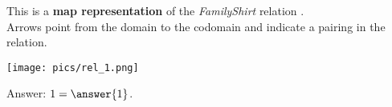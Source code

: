 \documentclass{ximera}
\author{Lee Wayand}
\begin{document}
\begin{exercise}

This is a \textbf{map representation} of the \textit{FamilyShirt} relation . \\


Arrows point from the domain to the codomain and indicate a pairing in the relation.


\begin{image}
\texttt{[image: pics/rel\_1.png]}
\end{image}






Answer: $ 1 = \answer{1}$.







\end{exercise}
\end{document}

